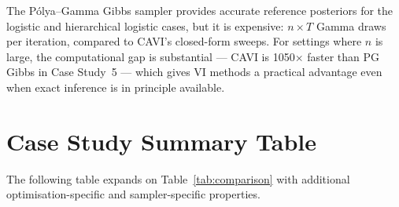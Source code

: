 \documentclass[11pt,a4paper]{article}
\begin{document}
The P\'{o}lya--Gamma Gibbs sampler provides accurate reference posteriors for the
logistic and hierarchical logistic cases, but it is expensive: $n\times T$ Gamma draws
per iteration, compared to CAVI's closed-form sweeps.
For settings where $n$ is large, the computational gap is substantial --- CAVI is
1050$\times$ faster than PG Gibbs in Case Study~5 --- which gives VI methods a
practical advantage even when exact inference is in principle available.

\nocite{*}
\printbibliography

\appendix

\section{Case Study Summary Table}
\label{app:comparison-table}

The following table expands on Table~\ref{tab:comparison} with additional
optimisation-specific and sampler-specific properties.
\end{document}
